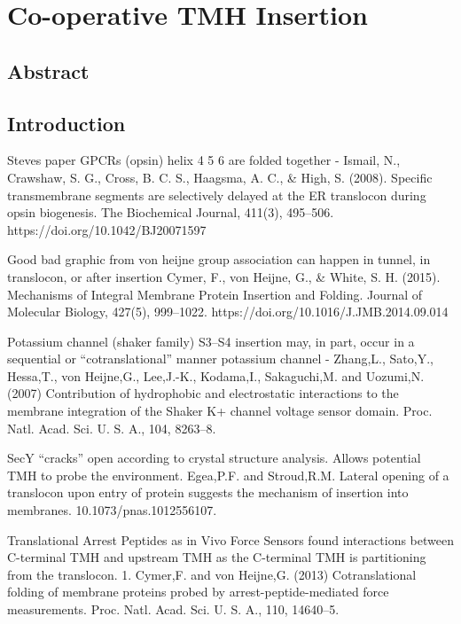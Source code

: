 
\chapter{Co-operative TMH Insertion}
\section{Abstract}
\section{Introduction}

Steves paper GPCRs (opsin) helix 4 5 6 are folded together - Ismail, N., Crawshaw, S. G., Cross, B. C. S., Haagsma, A. C., & High, S. (2008). Specific transmembrane segments are selectively delayed at the ER translocon during opsin biogenesis. The Biochemical Journal, 411(3), 495–506. https://doi.org/10.1042/BJ20071597



Good bad graphic from von heijne group association can happen in tunnel, in translocon, or after insertion Cymer, F., von  Heijne, G., & White, S. H. (2015). Mechanisms of Integral Membrane Protein Insertion and Folding. Journal of Molecular Biology, 427(5), 999–1022. https://doi.org/10.1016/J.JMB.2014.09.014



Potassium channel (shaker family) S3–S4 insertion may, in part, occur in a sequential or “cotranslational” manner potassium channel - Zhang,L., Sato,Y., Hessa,T., von Heijne,G., Lee,J.-K., Kodama,I., Sakaguchi,M. and Uozumi,N. (2007) Contribution of hydrophobic and electrostatic interactions to the membrane integration of the Shaker K+ channel voltage sensor domain. Proc. Natl. Acad. Sci. U. S. A., 104, 8263–8.




SecY “cracks” open according to crystal structure analysis. Allows potential TMH to probe the environment. Egea,P.F. and Stroud,R.M. Lateral opening of a translocon upon entry of protein suggests the mechanism of insertion into membranes. 10.1073/pnas.1012556107.




Translational Arrest Peptides as in Vivo Force Sensors found interactions between C-terminal TMH and upstream TMH as the C-terminal TMH is partitioning from the translocon. 1. Cymer,F. and von Heijne,G. (2013) Cotranslational folding of membrane proteins probed by arrest-peptide-mediated force measurements. Proc. Natl. Acad. Sci. U. S. A., 110, 14640–5.

